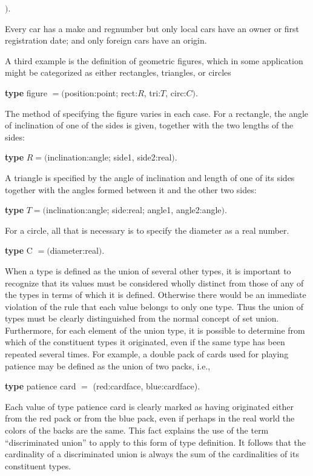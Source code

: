 \documentclass[twoside,11pt]{book}
\begin{document}
\tabto{7.1em}$)$.

\noindent
Every car has a make and regnumber but only local cars have an owner or first registration date; and only foreign cars have an origin. 

A third example is the definition of geometric figures, which in some application might be categorized as either rectangles, triangles, or circles

\quad \textbf{type} figure $= ($position:point; rect:$R$, tri:$T$, circ:$C)$.

\noindent
The method of specifying the figure varies in each case. For a rectangle, the angle of inclination of one of the sides is given, together with the two lengths of the sides:

\quad \textbf{type} $R = ($inclination:angle; side1, side2:real$)$.

\noindent
A triangle is specified by the angle of inclination and length of one of its sides together with the angles formed between it and the other two sides:

\quad \textbf{type} $T = ($inclination:angle; side:real; angle1, angle2:angle$)$.

\noindent
For a circle, all that is necessary is to specify the diameter as a real number.

\quad \textbf{type} C $= ($diameter:real$)$.

When a type is defined as the union of several other types, it is important to recognize that its values must be considered wholly distinct from those of any of the types in terms of which it is defined. Otherwise there would be an immediate violation of the rule that each value belongs to only one type. Thus the union of types must be clearly distinguished from the normal concept of set union. Furthermore, for each element of the union type, it is possible to determine from which of the constituent types it originated, even if the same type has been repeated several times. For example, a double pack of cards used for playing patience may be defined as the union of two packs, i.e.,

\quad \textbf{type} patience card $=$ (red:cardface, blue:cardface).

\noindent
Each value of type patience card is clearly marked as having originated either from the red pack or from the blue pack, even if perhaps in the real world the colors of the backs are the same. This fact explains the use of the term ``discriminated union'' to apply to this form of type definition. It follows that the cardinality of a discriminated union is always the sum of the cardinalities of its constituent types.
\end{document}
